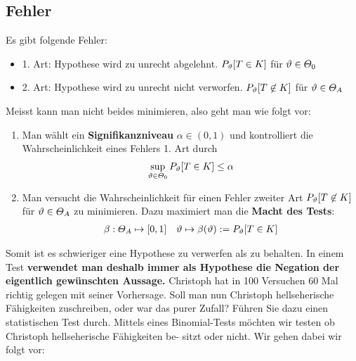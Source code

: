 \subsection*{Fehler}
Es gibt folgende Fehler:
\begin{itemize}
  \item 1. Art: Hypothese wird zu unrecht abgelehnt. $P_\vartheta[T \in K]$ für $\vartheta \in \varTheta_0$
  \item 2. Art: Hypothese wird zu unrecht nicht verworfen. $P_\vartheta[T \not \in K]$ für $\vartheta \in \varTheta_A$
\end{itemize}
Meisst kann man nicht beides minimieren, also geht man wie folgt vor:
\begin{enumerate}
  \item Man wählt ein \textbf{Signifikanzniveau} $\alpha \in (0, 1)$ und kontrolliert
        die Wahrscheinlichkeit eines Fehlers 1. Art durch
        \begin{align*}
          \sup_{\vartheta \in \varTheta_0} P_\vartheta[T \in K] \leq \alpha
        \end{align*}
  \item Man versucht die Wahrscheinlichkeit für einen Fehler zweiter Art $P_\vartheta[T \not
            \in K]$ für $\vartheta \in \varTheta_A$ zu minimieren. Dazu maximiert man die
        \textbf{Macht des Tests}:
        \begin{align*}
          \beta : \varTheta_A \mapsto [0, 1] &  & \vartheta \mapsto \beta (\vartheta) := P_\vartheta[T \in K]
        \end{align*}
\end{enumerate}
Somit ist es schwieriger eine Hypothese zu verwerfen als zu behalten. In einem
Test \textbf{verwendet man deshalb immer als Hypothese die Negation der eigentlich gewünschten Aussage.}
\BoxStart{}
Christoph hat in 100 Versuchen 60 Mal richtig gelegen mit seiner Vorhersage. Soll man nun
Christoph hellseherische Fähigkeiten zuschreiben, oder war das purer Zufall? Führen Sie dazu
einen statistischen Test durch.
Mittels eines Binomial-Tests möchten wir testen ob Christoph hellseherische Fähigkeiten be-
sitzt oder nicht. Wir gehen dabei wir folgt vor:
